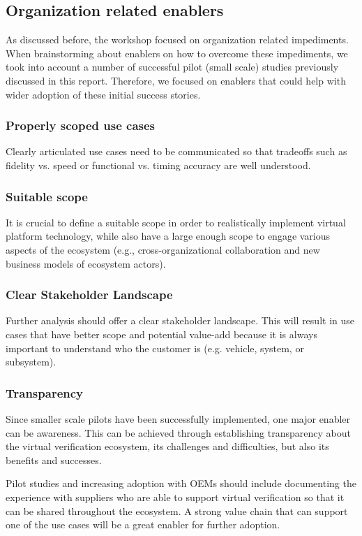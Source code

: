 \subsection{Organization related enablers}
As discussed before, the workshop focused on organization related impediments. When brainstorming about enablers on how to overcome these impediments, we took into account a number of successful pilot (small scale) studies previously discussed in this report. Therefore, we focused on enablers that could help with wider adoption of these initial success stories.
 
\subsubsection{Properly scoped use cases}
Clearly articulated use cases need to be communicated so that tradeoffs such as fidelity vs. speed or functional vs. timing accuracy are well understood.

\subsubsection{Suitable scope} It is crucial to define a suitable scope in order to realistically implement virtual platform technology, while also have a large enough scope to engage various aspects of the ecosystem (e.g., cross-organizational collaboration and new business models of ecosystem actors). 
 
\subsubsection{Clear Stakeholder Landscape}
Further analysis should offer a clear stakeholder landscape. This will result in use cases that have better scope and potential value-add because it is always important to understand who the customer is (e.g. vehicle, system, or subsystem).


\subsubsection{Transparency}
Since smaller scale pilots have been successfully implemented, one major enabler can be awareness. This can be achieved through establishing transparency about the virtual verification ecosystem, its challenges and difficulties, but also its benefits and successes. 

Pilot studies and increasing adoption with OEMs should include documenting the experience with suppliers who are able to support virtual verification so that it can be shared throughout the ecosystem. A strong value chain that can support one of the use cases will be a great enabler for further adoption.

